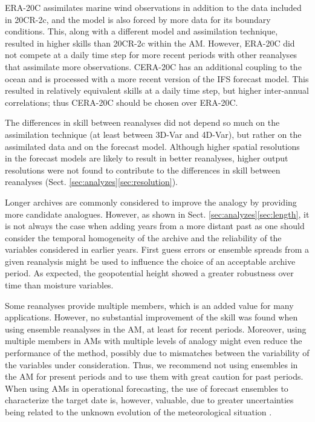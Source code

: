 \documentclass[smallextended]{svjour3}       %
\begin{document}
	ERA-20C assimilates marine wind observations in addition to the data included in 20CR-2c, and the model is also forced by more data for its boundary conditions. This, along with a different model and assimilation technique, resulted in higher skills than 20CR-2c within the AM. However, ERA-20C did not compete at a daily time step for more recent periods with other reanalyses that assimilate more observations. CERA-20C has an additional coupling to the ocean and is processed with a more recent version of the IFS forecast model. This resulted in relatively equivalent skills at a daily time step, but higher inter-annual correlations; thus CERA-20C should be chosen over ERA-20C.
	
	The differences in skill between reanalyses did not depend so much on the assimilation technique (at least between 3D-Var and 4D-Var), but rather on the assimilated data and on the forecast model. Although higher spatial resolutions in the forecast models are likely to result in better reanalyses, higher output resolutions were not found to contribute to the differences in skill between reanalyses (Sect. \ref{sec:analyzes}\ref{sec:resolution}). 
	
	Longer archives are commonly considered to improve the analogy by providing more candidate analogues. However, as shown in Sect. \ref{sec:analyzes}\ref{sec:length}, it is not always the case when adding years from a more distant past as one should consider the temporal homogeneity of the archive and the reliability of the variables considered in earlier years. First guess errors or ensemble spreads from a given reanalysis might be used to influence the choice of an acceptable archive period. As expected, the geopotential height showed a greater robustness over time than moisture variables. 
	
	Some reanalyses provide multiple members, which is an added value for many applications. However, no substantial improvement of the skill was found when using ensemble reanalyses in the AM, at least for recent periods. Moreover, using multiple members in AMs with multiple levels of analogy might even reduce the performance of the method, possibly due to mismatches between the variability of the variables under consideration. Thus, we recommend not using ensembles in the AM for present periods and to use them with great caution for past periods. When using AMs in operational forecasting, the use of forecast ensembles to characterize the target date is, however, valuable, due to greater uncertainties being related to the unknown evolution of the meteorological situation \citep{Thevenot2004}.
	
\end{document}
